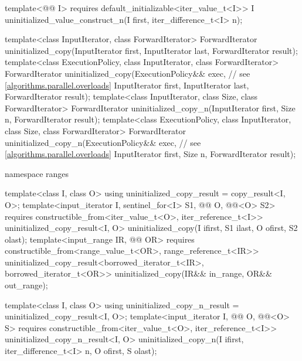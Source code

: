 \begin{codeblock}
{{    template<@@ I>
      requires default_initializable<iter_value_t<I>>
        I uninitialized_value_construct_n(I first, iter_difference_t<I> n);
  }

  template<class InputIterator, class ForwardIterator>
    ForwardIterator uninitialized_copy(InputIterator first, InputIterator last,
                                       ForwardIterator result);
  template<class ExecutionPolicy, class InputIterator, class ForwardIterator>
    ForwardIterator uninitialized_copy(ExecutionPolicy&& exec,  // see \ref{algorithms.parallel.overloads}
                                       InputIterator first, InputIterator last,
                                       ForwardIterator result);
  template<class InputIterator, class Size, class ForwardIterator>
    ForwardIterator uninitialized_copy_n(InputIterator first, Size n,
                                         ForwardIterator result);
  template<class ExecutionPolicy, class InputIterator, class Size, class ForwardIterator>
    ForwardIterator uninitialized_copy_n(ExecutionPolicy&& exec,        // see \ref{algorithms.parallel.overloads}
                                         InputIterator first, Size n,
                                         ForwardIterator result);

  namespace ranges {
    template<class I, class O>
    using uninitialized_copy_result = copy_result<I, O>;
    template<input_iterator I, sentinel_for<I> S1,
             @@ O, @@<O> S2>
      requires constructible_from<iter_value_t<O>, iter_reference_t<I>>
        uninitialized_copy_result<I, O>
          uninitialized_copy(I ifirst, S1 ilast, O ofirst, S2 olast);
    template<input_range IR, @@ OR>
      requires constructible_from<range_value_t<OR>, range_reference_t<IR>>
        uninitialized_copy_result<borrowed_iterator_t<IR>, borrowed_iterator_t<OR>>
          uninitialized_copy(IR&& in_range, OR&& out_range);

    template<class I, class O>
      using uninitialized_copy_n_result = uninitialized_copy_result<I, O>;
    template<input_iterator I, @@ O, @@<O> S>
      requires constructible_from<iter_value_t<O>, iter_reference_t<I>>
        uninitialized_copy_n_result<I, O>
          uninitialized_copy_n(I ifirst, iter_difference_t<I> n, O ofirst, S olast);
  }

}
\end{codeblock}
